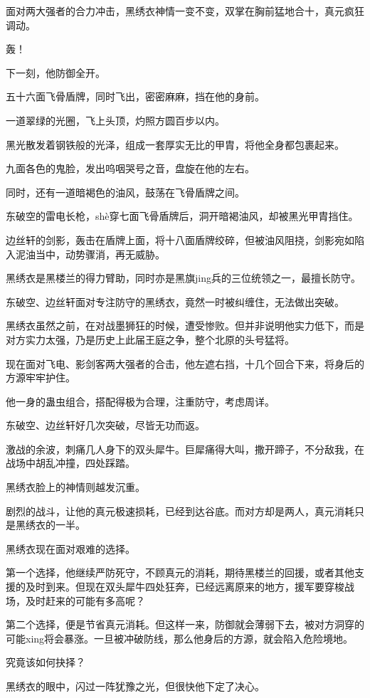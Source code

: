 \begin{this_body}
面对两大强者的合力冲击，黑绣衣神情一变不变，双掌在胸前猛地合十，真元疯狂调动。

轰！

下一刻，他防御全开。

五十六面飞骨盾牌，同时飞出，密密麻麻，挡在他的身前。

一道翠绿的光圈，飞上头顶，灼照方圆百步以内。

黑光散发着钢铁般的光泽，组成一套厚实无比的甲胄，将他全身都包裹起来。

九面各色的鬼脸，发出呜咽哭号之音，盘旋在他的左右。

同时，还有一道暗褐色的油风，鼓荡在飞骨盾牌之间。

东破空的雷电长枪，shè穿七面飞骨盾牌后，洞开暗褐油风，却被黑光甲胄挡住。

边丝轩的剑影，轰击在盾牌上面，将十八面盾牌绞碎，但被油风阻挠，剑影宛如陷入泥油当中，动势骤消，再无威胁。

黑绣衣是黑楼兰的得力臂助，同时亦是黑旗jing兵的三位统领之一，最擅长防守。

东破空、边丝轩面对专注防守的黑绣衣，竟然一时被纠缠住，无法做出突破。

黑绣衣虽然之前，在对战墨狮狂的时候，遭受惨败。但并非说明他实力低下，而是对方实力太强，乃是历史上此届王庭之争，整个北原的头号猛将。

现在面对飞电、影剑客两大强者的合击，他左遮右挡，十几个回合下来，将身后的方源牢牢护住。

他一身的蛊虫组合，搭配得极为合理，注重防守，考虑周详。

东破空、边丝轩好几次突破，尽皆无功而返。

激战的余波，刺痛几人身下的双头犀牛。巨犀痛得大叫，撒开蹄子，不分敌我，在战场中胡乱冲撞，四处踩踏。

黑绣衣脸上的神情则越发沉重。

剧烈的战斗，让他的真元极速损耗，已经到达谷底。而对方却是两人，真元消耗只是黑绣衣的一半。

黑绣衣现在面对艰难的选择。

第一个选择，他继续严防死守，不顾真元的消耗，期待黑楼兰的回援，或者其他支援的及时到来。但现在双头犀牛四处狂奔，已经远离原来的地方，援军要穿梭战场，及时赶来的可能有多高呢？

第二个选择，便是节省真元消耗。但这样一来，防御就会薄弱下去，被对方洞穿的可能xing将会暴涨。一旦被冲破防线，那么他身后的方源，就会陷入危险境地。

究竟该如何抉择？

黑绣衣的眼中，闪过一阵犹豫之光，但很快他下定了决心。


\end{this_body}
